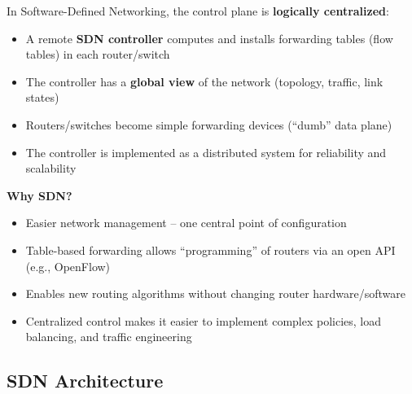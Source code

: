 \begin{keybox}
In Software-Defined Networking, the control plane is \textbf{logically centralized}:
\begin{itemize}[noitemsep]
    \item A remote \textbf{SDN controller} computes and installs forwarding tables (flow tables) in each router/switch
    \item The controller has a \textbf{global view} of the network (topology, traffic, link states)
    \item Routers/switches become simple forwarding devices (``dumb'' data plane)
    \item The controller is implemented as a distributed system for reliability and scalability
\end{itemize}

\textbf{Why SDN?}
\begin{itemize}[noitemsep]
    \item Easier network management -- one central point of configuration
    \item Table-based forwarding allows ``programming'' of routers via an open API (e.g., OpenFlow)
    \item Enables new routing algorithms without changing router hardware/software
    \item Centralized control makes it easier to implement complex policies, load balancing, and traffic engineering
\end{itemize}
\end{keybox}

\subsection{SDN Architecture}

